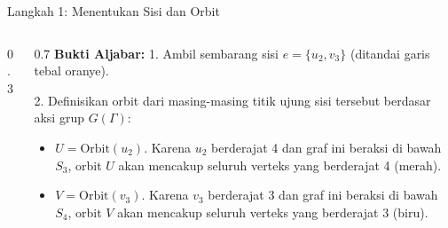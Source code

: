 \documentclass[aspectratio=169]{beamer}
\begin{document}
\begin{frame}[fragile]{Langkah 1: Menentukan Sisi dan Orbit}
  \begin{columns}
    \begin{column}{0.3\textwidth}
    \end{column}

    \begin{column}{0.7\textwidth}
      \small
      \textbf{Bukti Aljabar:}
      1. Ambil sembarang sisi $e = \{u_2, v_3\}$ (ditandai garis tebal oranye).

      2. Definisikan orbit dari masing-masing titik ujung sisi tersebut berdasar aksi grup $G(\Gamma)$:
      \begin{itemize}
        \item $U = \text{Orbit}(u_2)$. Karena $u_2$ berderajat 4 dan graf ini beraksi di bawah $S_3$, orbit $U$ akan mencakup seluruh verteks yang berderajat 4 (merah).
        \item $V = \text{Orbit}(v_3)$. Karena $v_3$ berderajat 3 dan graf ini beraksi di bawah $S_4$, orbit $V$ akan mencakup seluruh verteks yang berderajat 3 (biru).
      \end{itemize}
    \end{column}
  \end{columns}
\end{frame}
\end{document}
